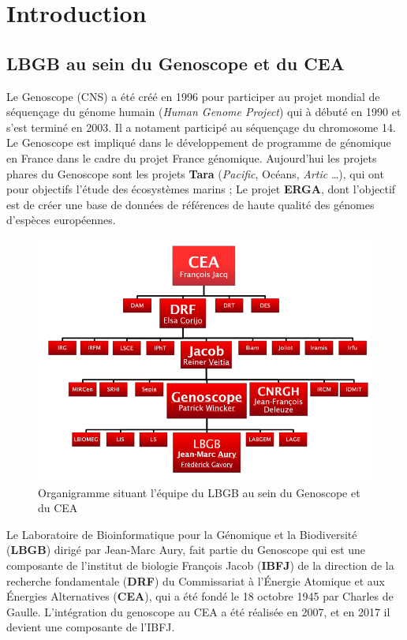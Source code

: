 \section{Introduction}
\subsection{LBGB au sein du Genoscope et du CEA}
Le Genoscope (CNS) a été créé en 1996 pour participer au projet mondial de séquençage du génome humain (\emph{Human Genome Project}) qui à débuté en 1990 et s'est terminé en 2003. Il a notament participé au séquençage du chromosome 14. Le Genoscope est impliqué dans le développement de programme de génomique en France dans le cadre du projet France génomique. Aujourd'hui les projets phares du Genoscope sont les projets \textbf{Tara} (\emph{Pacific}, Océans, \emph{Artic} \dots), qui ont pour objectifs l'étude des écosystèmes marins ; Le projet \textbf{ERGA}, dont l'objectif est de créer une base de données de références de haute qualité des génomes d'espèces européennes.

\begin{minipage}{0.45\textwidth}
\begin{figure}[H]
    \includegraphics[width=1.1\textwidth]{img/organigramme.png}
    \caption{Organigramme situant l’équipe du LBGB au sein du Genoscope et du CEA}
    \label{organigramme_LBGB}
\end{figure}
\end{minipage} 
\hfill
\begin{minipage}{0.45\textwidth}
    Le Laboratoire de Bioinformatique pour la Génomique et la Biodiversité (\textbf{LBGB}) dirigé par Jean-Marc Aury, fait partie du Genoscope qui est une composante de l'institut de biologie François Jacob (\textbf{IBFJ}) de la direction de la recherche fondamentale (\textbf{DRF}) du Commissariat à l'Énergie Atomique et aux Énergies Alternatives (\textbf{CEA}), qui a été fondé le 18 octobre 1945 par Charles de Gaulle. L'intégration du genoscope au CEA a été réalisée en 2007, et en 2017 il devient une composante de l'IBFJ.
\end{minipage}

